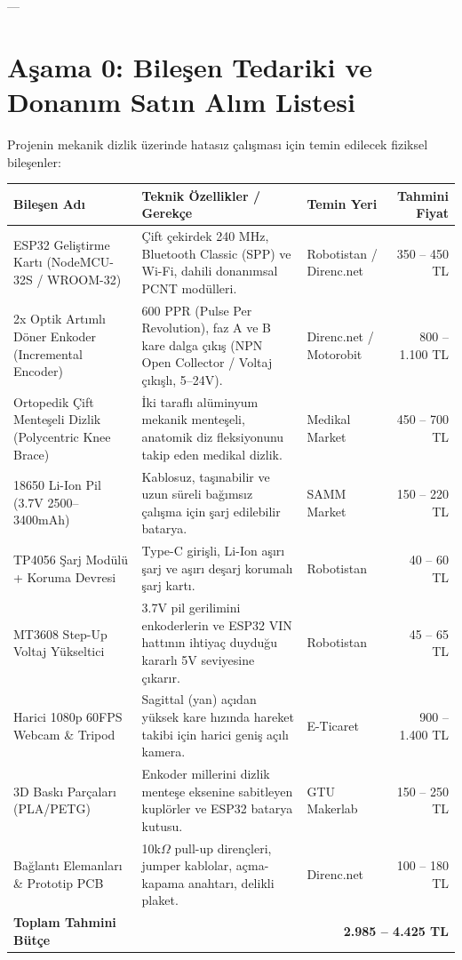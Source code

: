 \documentclass[11pt, a4paper]{article}
\begin{document}
---

\section{Aşama 0: Bileşen Tedariki ve Donanım Satın Alım Listesi}

Projenin mekanik dizlik üzerinde hatasız çalışması için temin edilecek fiziksel bileşenler:

\renewcommand{\arraystretch}{1.2}
\begin{tabularx}{\textwidth}{p{4.2cm} X p{2.2cm} r}
\toprule
\rowcolor{lightgray} Bileşen Adı & Teknik Özellikler / Gerekçe & Temin Yeri & Tahmini Fiyat \\
\midrule
ESP32 Geliştirme Kartı (NodeMCU-32S / WROOM-32) & Çift çekirdek 240 MHz, Bluetooth Classic (SPP) ve Wi-Fi, dahili donanımsal PCNT modülleri. & Robotistan / Direnc.net & 350 -- 450 TL \\
\midrule
2x Optik Artımlı Döner Enkoder (Incremental Encoder) & 600 PPR (Pulse Per Revolution), faz A ve B kare dalga çıkış (NPN Open Collector / Voltaj çıkışlı, 5--24V). & Direnc.net / Motorobit & 800 -- 1.100 TL \\
\midrule
Ortopedik Çift Menteşeli Dizlik (Polycentric Knee Brace) & İki taraflı alüminyum mekanik menteşeli, anatomik diz fleksiyonunu takip eden medikal dizlik. & Medikal Market & 450 -- 700 TL \\
\midrule
18650 Li-Ion Pil (3.7V 2500--3400mAh) & Kablosuz, taşınabilir ve uzun süreli bağımsız çalışma için şarj edilebilir batarya. & SAMM Market & 150 -- 220 TL \\
\midrule
TP4056 Şarj Modülü + Koruma Devresi & Type-C girişli, Li-Ion aşırı şarj ve aşırı deşarj korumalı şarj kartı. & Robotistan & 40 -- 60 TL \\
\midrule
MT3608 Step-Up Voltaj Yükseltici & 3.7V pil gerilimini enkoderlerin ve ESP32 VIN hattının ihtiyaç duyduğu kararlı 5V seviyesine çıkarır. & Robotistan & 45 -- 65 TL \\
\midrule
Harici 1080p 60FPS Webcam \& Tripod & Sagittal (yan) açıdan yüksek kare hızında hareket takibi için harici geniş açılı kamera. & E-Ticaret & 900 -- 1.400 TL \\
\midrule
3D Baskı Parçaları (PLA/PETG) & Enkoder millerini dizlik menteşe eksenine sabitleyen kuplörler ve ESP32 batarya kutusu. & GTU Makerlab & 150 -- 250 TL \\
\midrule
Bağlantı Elemanları \& Prototip PCB & 10k$\Omega$ pull-up dirençleri, jumper kablolar, açma-kapama anahtarı, delikli plaket. & Direnc.net & 100 -- 180 TL \\
\midrule
\textbf{Toplam Tahmini Bütçe} & \multicolumn{3}{r}{\textbf{2.985 -- 4.425 TL}} \\
\bottomrule
\end{tabularx}
\end{document}
